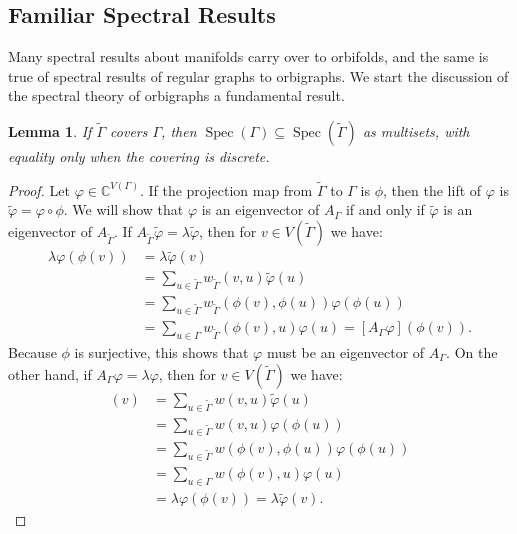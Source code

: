 \documentclass[12pt]{article}
\theoremstyle{plain}
\newtheorem{lemma}[theorem]{Lemma}
\theoremstyle{definition}
\theoremstyle{remark}
\DeclareMathOperator*{\spec}{Spec}
\providecommand{\cover}[1]{\widetilde{#1}}
\begin{document}
  \subsection{Familiar Spectral Results}

    Many spectral results about manifolds carry over to orbifolds, and the same is true of spectral results of regular graphs to orbigraphs. We start the discussion of the spectral theory of orbigraphs a fundamental result.

    \begin{lemma}\label{lemma:SpectrumInclusion}
      If $\widetilde{\Gamma}$ covers $\Gamma$, then $\spec(\Gamma) \subseteq \spec(\widetilde{\Gamma})$ as multisets, with equality only when the covering is discrete.
    \end{lemma}
    \begin{proof}
      Let $\varphi \in \mathbb{C}^{V(\Gamma)}$. If the projection map from $\cover{\Gamma}$ to $\Gamma$ is $\phi$, then the lift of $\varphi$ is $\cover{\varphi} = \varphi \circ \phi$. We will show that $\varphi$ is an eigenvector of $A_\Gamma$ if and only if $\cover{\varphi}$ is an eigenvector of $A_{\cover{\Gamma}}$. If $A_{\cover{\Gamma}} \cover{\varphi} = \lambda \cover{\varphi}$, then for $v \in V(\cover{\Gamma})$ we have:
      \begin{align*}
        \lambda \varphi(\phi(v)) &= \lambda \cover{\varphi}(v) \\
        &= \sum_{u \in \cover{\Gamma}} w_{\cover{\Gamma}}(v, u)\cover{\varphi}(u) \\
        &= \sum_{u \in \cover{\Gamma}} w_{\cover{\Gamma}}(\phi(v), \phi(u)) \varphi(\phi(u)) \\
        &= \sum_{u \in \Gamma} w_{\cover{\Gamma}}(\phi(v), u) \varphi(u) = [A_\Gamma \varphi](\phi(v)).
      \end{align*}
      Because $\phi$ is surjective, this shows that $\varphi$ must be an eigenvector of $A_\Gamma$. On the other hand, if $A_\Gamma \varphi = \lambda \varphi$, then for $v \in V(\cover{\Gamma})$ we have:
      \begin{align*}
        [A_{\cover{\Gamma}} \cover{\varphi}](v) &= \sum_{u \in \cover{\Gamma}} w(v, u) \cover{\varphi}(u) \\
        &= \sum_{u \in \cover{\Gamma}} w(v, u) \varphi(\phi(u)) \\
        &= \sum_{u \in \cover{\Gamma}} w(\phi(v), \phi(u)) \varphi(\phi(u)) \\
        &= \sum_{u \in \Gamma} w(\phi(v), u) \varphi(u) \\
        &= \lambda \varphi(\phi(v)) = \lambda \cover{\varphi}(v).
      \end{align*}
    \end{proof}
\end{document}
